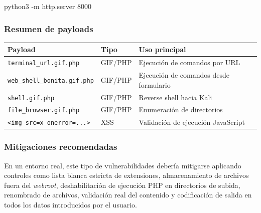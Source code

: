 \begin{bashbox}
python3 -m http.server 8000
\end{bashbox}

\subsubsection*{Resumen de payloads}

\renewcommand{\arraystretch}{1.4}
\begin{table}[H]
    \centering

    \begin{tabular}{|C{4cm}|C{4cm}|C{5cm}|}
        \hline
        \textbf{Payload} & \textbf{Tipo} & \textbf{Uso principal} \\
        \hline
        \texttt{terminal\_url.gif.php} & GIF/PHP & Ejecución de comandos por URL \\
        \hline
        \texttt{web\_shell\_bonita.gif.php} & GIF/PHP & Ejecución de comandos desde formulario \\
        \hline
        \texttt{shell.gif.php} & GIF/PHP & Reverse shell hacia Kali \\
        \hline
        \texttt{file\_browser.gif.php} & GIF/PHP & Enumeración de directorios \\
        \hline
        \texttt{<img src=x onerror=...>} & XSS & Validación de ejecución JavaScript \\
        \hline
    \end{tabular}

    \label{tab:payloads_explotacion_web}
\end{table}
\renewcommand{\arraystretch}{1}

\subsubsection*{Mitigaciones recomendadas}

En un entorno real, este tipo de vulnerabilidades debería mitigarse aplicando controles como lista blanca estricta de extensiones, almacenamiento de archivos fuera del \textit{webroot}, deshabilitación de ejecución PHP en directorios de subida, renombrado de archivos, validación real del contenido y codificación de salida en todos los datos introducidos por el usuario.

